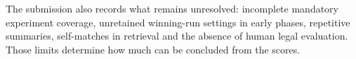 \documentclass[11pt, oneside]{article}
\begin{document}
The submission also records what remains unresolved: incomplete mandatory experiment coverage,
unretained winning-run settings in early phases, repetitive summaries, self-matches in retrieval and the
absence of human legal evaluation. Those limits determine how much can be concluded from the scores.
\label{main-end}
\clearpage

\clearpage


\clearpage
\appendix

\end{document}
